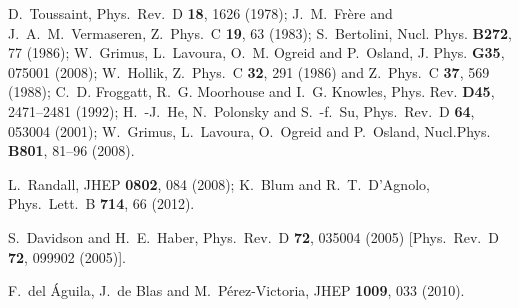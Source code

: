   D.~Toussaint,
  Phys.\ Rev.\ D {\bf 18}, 1626 (1978);
  J.~M.~Fr\`ere and J.~A.~M.~Vermaseren,
  Z.\ Phys.\ C {\bf 19}, 63 (1983);
  S.~Bertolini,
  Nucl. Phys. \textbf{ B272}, 77 (1986);
  W.~Grimus, L.~Lavoura, O.~M. Ogreid and P.~Osland,
  J. Phys. \textbf{ G35}, 075001 (2008);
  W.~Hollik,
  Z.\ Phys.\ C {\bf 32}, 291 (1986) 
  and
  Z.\ Phys.\ C {\bf 37}, 569 (1988);
  C.~D. Froggatt, R.~G. Moorhouse and I.~G. Knowles,
  Phys. Rev. \textbf{ D45}, 2471--2481 (1992);
  H.~-J.~He, N.~Polonsky and S.~-f.~Su,
  Phys.\ Rev.\ D {\bf 64}, 053004 (2001);
  W.~Grimus, L.~Lavoura, O.~Ogreid and P.~Osland,
  Nucl.Phys. \textbf{ B801}, 81--96 (2008).

  L.~Randall,
  JHEP {\bf 0802}, 084 (2008);
  K.~Blum and R.~T.~D'Agnolo,
  Phys.\ Lett.\ B {\bf 714}, 66 (2012).

  S.~Davidson and H.~E.~Haber,
  Phys.\ Rev.\ D {\bf 72}, 035004 (2005)
  [Phys.\ Rev.\ D {\bf 72}, 099902 (2005)].
  
  F.~del \'Aguila, J.~de Blas and M.~P\'erez-Victoria,
  JHEP {\bf 1009}, 033 (2010).
